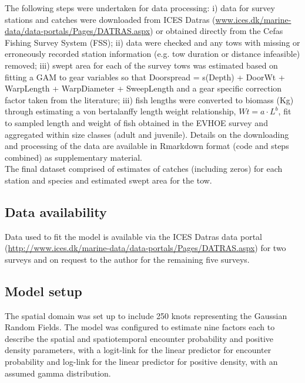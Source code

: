 \documentclass[fleqn,10pt]{wlscirep}
\begin{document}
\begin{linenumbers}
The following steps were undertaken for data processing: i) data for survey
stations and catches were downloaded from ICES Datras
(\url{www.ices.dk/marine-data/data-portals/Pages/DATRAS.aspx}) or obtained
directly from the Cefas Fishing Survey System (FSS); ii) data were checked and
any tows with missing or erroneously recorded station information (e.g. tow
duration or distance infeasible) removed; iii) swept area for each of the
survey tows was estimated based on fitting a GAM to gear variables so that
Doorspread = s(Depth) + DoorWt + WarpLength + WarpDiameter + SweepLength and a
gear specific correction factor taken from the literature\cite{Piet2009}; iii)
fish lengths were converted to biomass (Kg) through estimating a von
bertalanffy length weight relationship, $Wt = a \cdot L^{b}$, fit to sampled
length and weight of fish obtained in the EVHOE survey and aggregated within
size classes (adult and juvenile). Details on the downloading and processing of
the data are available in Rmarkdown format (code and steps combined) as
supplementary material. \\

The final dataset comprised of estimates of catches (including zeros) for each
station and species and estimated swept area for the tow.\\

\subsection*{Data availability\\}

Data used to fit the model is available via the ICES Datras data portal
(\url{http://www.ices.dk/marine-data/data-portals/Pages/DATRAS.aspx}) for two
surveys and on request to the author for the remaining five surveys.\\

\subsection*{Model setup\\}

The spatial domain was set up to include 250 knots representing the Gaussian
Random Fields. The model was configured to estimate nine factors each to describe
the spatial and spatiotemporal encounter probability and positive density
parameters, with a logit-link for the linear predictor for encounter
probability and log-link for the linear predictor for positive density, with an
assumed gamma distribution.\\


\end{linenumbers}
\end{document}
